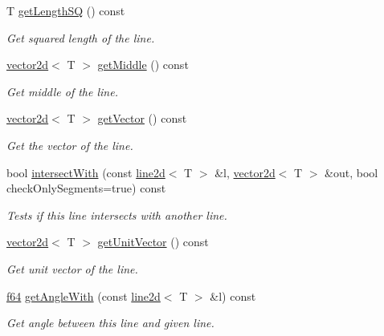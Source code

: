 \begin{DoxyCompactItemize}
T \hyperlink{classirr_1_1core_1_1line2d_ab2e1b51af84b3f134a32ebb0b7e6968f}{get\+Length\+SQ} () const
\begin{DoxyCompactList}\small\item\em Get squared length of the line. \end{DoxyCompactList}\item 
\hyperlink{classirr_1_1core_1_1vector2d}{vector2d}$<$ T $>$ \hyperlink{classirr_1_1core_1_1line2d_a18c94540c89997e0a4acc96e08f6f4a0}{get\+Middle} () const
\begin{DoxyCompactList}\small\item\em Get middle of the line. \end{DoxyCompactList}\item 
\hyperlink{classirr_1_1core_1_1vector2d}{vector2d}$<$ T $>$ \hyperlink{classirr_1_1core_1_1line2d_aeb0b7bc3987165abc0eaca7f0e506a59}{get\+Vector} () const
\begin{DoxyCompactList}\small\item\em Get the vector of the line. \end{DoxyCompactList}\item 
bool \hyperlink{classirr_1_1core_1_1line2d_aafba758c667b6d03b7a6e0f51a5831f0}{intersect\+With} (const \hyperlink{classirr_1_1core_1_1line2d}{line2d}$<$ T $>$ \&l, \hyperlink{classirr_1_1core_1_1vector2d}{vector2d}$<$ T $>$ \&out, bool check\+Only\+Segments=true) const
\begin{DoxyCompactList}\small\item\em Tests if this line intersects with another line. \end{DoxyCompactList}\item 
\hyperlink{classirr_1_1core_1_1vector2d}{vector2d}$<$ T $>$ \hyperlink{classirr_1_1core_1_1line2d_ae3f1a52b3057168c41d283d100d13c79}{get\+Unit\+Vector} () const
\begin{DoxyCompactList}\small\item\em Get unit vector of the line. \end{DoxyCompactList}\item 
\hyperlink{namespaceirr_a1325b02603ad449f92c68fc640af9b28}{f64} \hyperlink{classirr_1_1core_1_1line2d_a0342a0b17c9318cb1eb1183cb91abaf4}{get\+Angle\+With} (const \hyperlink{classirr_1_1core_1_1line2d}{line2d}$<$ T $>$ \&l) const
\begin{DoxyCompactList}\small\item\em Get angle between this line and given line. \end{DoxyCompactList}\item 

\end{DoxyCompactItemize}
